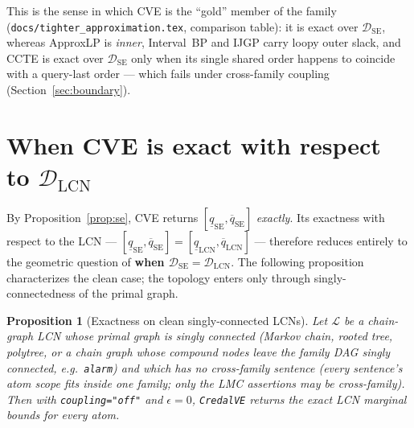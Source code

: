 \documentclass[11pt]{article}
\newtheorem{proposition}{Proposition}
\newcommand{\lo}{\underline}
\newcommand{\hi}{\overline}
\newcommand{\DSE}{\mathcal{D}_{\mathrm{SE}}}
\newcommand{\DLCN}{\mathcal{D}_{\mathrm{LCN}}}
\newcommand{\CVE}{\texttt{CredalVE}}
\begin{document}
\noindent This is the sense in which CVE is the ``gold'' member of the family
(\texttt{docs/tighter\_approximation.tex}, comparison table): it is exact over $\DSE$, whereas
ApproxLP is \emph{inner}, Interval~BP and IJGP carry loopy outer slack, and CCTE is exact over $\DSE$
only when its single shared order happens to coincide with a query-last order --- which fails under
cross-family coupling (Section~\ref{sec:boundary}).

\section{When CVE is exact with respect to $\DLCN$}\label{sec:exact}

By Proposition~\ref{prop:se}, CVE returns $[\lo q_{\mathrm{SE}},\hi q_{\mathrm{SE}}]$ \emph{exactly}.
Its exactness with respect to the LCN --- $[\lo q_{\mathrm{SE}},\hi q_{\mathrm{SE}}]=[\lo
q_{\mathrm{LCN}},\hi q_{\mathrm{LCN}}]$ --- therefore reduces entirely to the geometric question of
\textbf{when $\DSE=\DLCN$}. The following proposition characterizes the clean case; the topology
enters only through singly-connectedness of the primal graph.

\begin{proposition}[Exactness on clean singly-connected LCNs]\label{prop:exact}
Let $\mathcal L$ be a chain-graph LCN whose primal graph is singly connected (Markov chain, rooted
tree, polytree, or a chain graph whose compound nodes leave the family DAG singly connected, e.g.\
\texttt{alarm}) and which has \emph{no cross-family sentence} (every sentence's atom scope fits
inside one family; only the LMC assertions may be cross-family). Then with \texttt{coupling="off"}
and $\epsilon=0$, \CVE{} returns the exact LCN marginal bounds for every atom.
\end{proposition}
\end{document}
